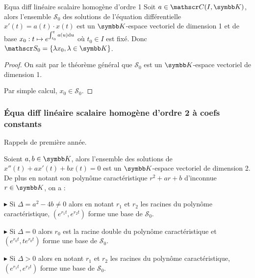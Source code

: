 
\begin{theoreme}{Equa diff linéaire scalaire homogène d'ordre 1}{}
    Soit $a \in \mathscr C (I, \K)$, alors l'ensemble $\mathscr S_0$ des solutions de l'équation différentielle  
    ${x'(t) = a(t) \cdot x(t)}$ est un $\K$-espace vectoriel de dimension 1 et de 
    base $x_0 \displaystyle : t \mapsto e^{\int_{t_0}^{t} a(u) \mathrm d u}$ où 
    $t_0 \in I$ est fixé. Donc $\mathscr S_0 = \{ \lambda x_0, \lambda \in \K \}$.
\end{theoreme}

\begin{proof}
    On sait par le théorème général que $\mathscr S_0$ est un $\K$-espace vectoriel de dimension 1. 

    Par simple calcul, $x_0 \in \mathscr S_0$.
\end{proof}

\subsubsection{\'Equa diff linéaire scalaire homogène d'ordre 2 à coefs constants}

Rappels de première année. 

Soient $a, b \in \K$, alors l'ensemble des solutions de $x''(t) + ax'(t) +bx(t) = 0$ est 
un $\K$-espace vectoriel de dimension 2. De plus en notant son polynôme 
caractéristique $r^2 + ar + b$ d'inconnue $r \in \K$, on a : 


\svspace $\blacktriangleright$ Si $\Delta = a^2 - 4b \neq 0$ alors en notant $r_1$ et $r_2$ les racines 
du polynôme caractéristique, $(e^{r_1 t}, e^{r_2 t})$ forme une base de $\mathscr S_0$.

$\blacktriangleright$ Si $\Delta = 0$ alors $r_0$ est la racine double du polynôme caractéristique et $(e^{r_0 t}, te^{r_0 t})$ forme une base de $\mathscr S_0$.


\svspace $\blacktriangleright$ Si $\Delta > 0$ alors en notant $r_1$ et $r_2$ les racines du polynôme caractéristique, $(e^{r_1 t}, e^{r_2 t})$ forme une base de $\mathscr S_0$.

